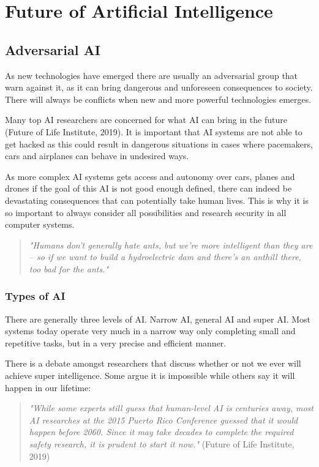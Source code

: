 \documentclass[
a4paper,
11pt,
english
]{report}
\begin{document}
\section{Future of Artificial Intelligence}
\subsection{Adversarial AI}
As new technologies have emerged there are usually an adversarial group that warn against it, as it can bring dangerous and unforeseen consequences to society. There will always be conflicts when new and more powerful technologies emerges.

Many top AI researchers are concerned for what AI can bring in the future (Future of Life Institute, 2019). It is important that AI systems are not able to get hacked as this could result in dangerous situations in cases where pacemakers, cars and airplanes can behave in undesired ways.

As more complex AI systems gets access and autonomy over cars, planes and drones if the goal of this AI is not good enough defined, there can indeed be devastating consequences that can potentially take human lives. This is why it is so important to always consider all possibilities and research security in all computer systems.

\begin{quote}
    \textit{"Humans don’t generally hate ants, but we’re more intelligent than they are – so if we want to build a hydroelectric dam and there’s an anthill there, too bad for the ants."}
\end{quote}

\subsubsection{Types of AI}
There are generally three levels of AI. Narrow AI, general AI and super AI. Most systems today operate very much in a narrow way only completing small and repetitive tasks, but in a very precise and efficient manner.

There is a debate amongst researchers that discuss whether or not we ever will achieve super intelligence. Some argue it is impossible while others say it will happen in our lifetime:

\begin{quote}
    \textit{"While some experts still guess that human-level AI is centuries away, most AI researches at the 2015 Puerto Rico Conference guessed that it would happen before 2060. Since it may take decades to complete the required safety research, it is prudent to start it now."} (Future of Life Institute, 2019)
\end{quote}
\end{document}
